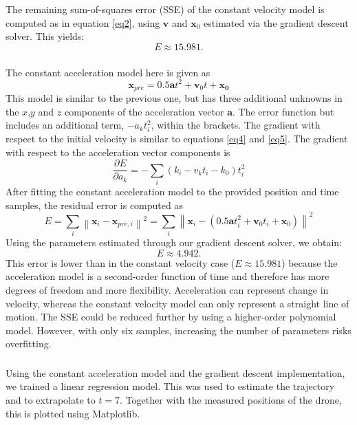 \documentclass{article}
\begin{document}
The remaining sum-of-squares error (SSE) of the constant velocity model is computed as in equation \ref{eq2}, using $\mathbf{v}$ and $\mathbf{x}_0$ estimated via the gradient descent solver. This yields:
\begin{equation}
E \approx 15.981 .
\end{equation}

\subsubsection{}
The constant acceleration model here is given as
\begin{equation}
    \mathbf{x}_{pre}=0.5\mathbf{a}t^2 + \mathbf{v}_0t+\mathbf{x_0}
\end{equation}
This model is similar to the previous one, but has three additional unknowns in the $x$,$y$ and $z$ components of the acceleration vector $\mathbf{a}$. The error function but includes an additional term, $-a_kt_i^2$, within the brackets. The gradient with respect to the initial velocity is similar to equations \ref{eq4} and \ref{eq5}. The gradient with respect to the acceleration vector components is
\begin{equation}
        \frac{\partial E}{\partial a_k} = -\sum_i(k_i-v_kt_i-k_0)t_i^2
\end{equation}
After fitting the constant acceleration model to the provided position and time samples, the residual error is computed as
\begin{equation}
E = \sum_i \left\| \mathbf{x}_i - \mathbf{x}_{pre,i} \right\|^2
  = \sum_i \left\| \mathbf{x}_i - \left(0.5\mathbf{a}t_i^2 + \mathbf{v}_0t_i + \mathbf{x}_0\right) \right\|^2
\end{equation}
Using the parameters estimated through our gradient descent solver, we obtain:
\begin{equation}
E \approx 4.942 .
\end{equation}
This error is lower than in the constant velocity case ($E \approx 15.981$) because the acceleration model is a second-order function of time and therefore has more degrees of freedom and more flexibility. Acceleration can represent change in velocity, whereas the constant velocity model can only represent a straight line of motion.
The SSE could be reduced further by using a higher-order polynomial model. However, with only six samples, increasing the number of parameters risks overfitting.

\subsubsection{}
Using the constant acceleration model and the gradient descent implementation, we trained a linear regression model. This was used to estimate the trajectory and to extrapolate to $t=7$. Together with the measured positions of the drone, this is plotted using Matplotlib. 
\end{document}
